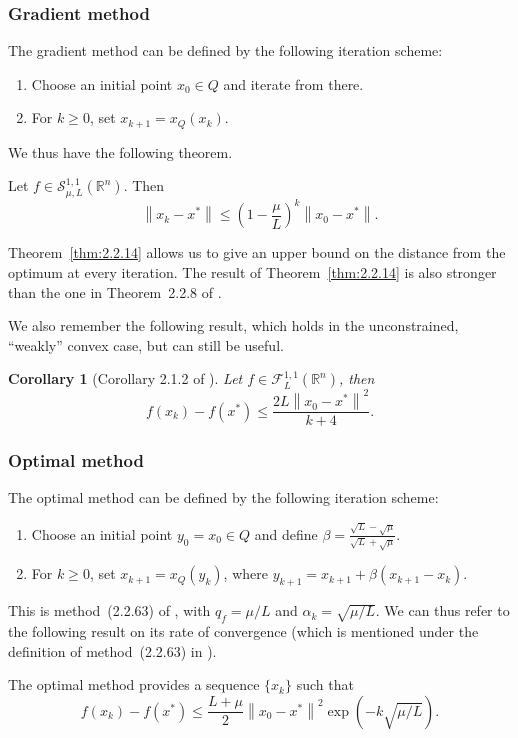 \documentclass[final]{aomart}
\newtheorem[{}\it]{thm}{Theorem}[section]
\newtheorem{cor}[thm]{Corollary}
\theoremstyle{definition}
\newtheorem*[{}\it]{notation}{Notation}
\numberwithin{equation}{section}
\newcommand{\thmref}[1]{Theorem~\ref{#1}}
\newcommand{\enVert}[1]{\left\lVert#1\right\rVert}
\let\norm=\enVert
\newcommand{\sconvex}{\mathscr{S}}
\begin{document}
\subsubsection{Gradient method}
The gradient method can be defined by the following iteration scheme:
\begin{enumerate}
	\item Choose an initial point \(x_0 \in Q\) and iterate from there.
	\item For \(k \geqslant 0\), set \(x_{k+1} = x_Q(x_k)\).
\end{enumerate}
We thus have the following theorem.
\begin{thm}
	\label{thm:2.2.14}
	Let \(f \in \sconvex_{\mu, L}^{1, 1}(\mathbb{R}^n)\).
	Then
	\begin{equation}
	\norm{x_k - x^*} \leqslant \left(1 - \frac{\mu}{L}\right)^k \norm{x_0 - x^*}.
	\end{equation}
\end{thm}
\thmref{thm:2.2.14} allows us to give an upper bound on the distance from the optimum at every iteration.
The result of \thmref{thm:2.2.14} is also stronger than the one in Theorem~2.2.8 of \cite{Nesterov2004}.

We also remember the following result, which holds in the unconstrained, ``weakly'' convex case, but can still be useful.
\begin{cor}[Corollary 2.1.2 of \cite{Nesterov2018}]
	\label{cor:2.1.2}
	Let \(f \in \mathscr{F}^{1, 1}_{L}(\mathbb{R}^n)\), then
	\begin{equation}
	f(x_k) - f(x^*) \leqslant \frac{2L\norm{x_0 - x^*}^2}{k+4}.
	\end{equation}
\end{cor}

\subsubsection{Optimal method}
The optimal method can be defined by the following iteration scheme:
\begin{enumerate}
	\item Choose an initial point \(y_0 = x_0 \in Q\) and define \(\beta = \frac{\sqrt{L} - \sqrt{\mu}}{\sqrt{L} + \sqrt{\mu}}\).
	\item For \(k \geqslant 0\), set \(x_{k+1} = x_Q(y_k)\), where \(y_{k+1} = x_{k+1} + \beta (x_{k+1} - x_k)\).
\end{enumerate}

This is method~(2.2.63) of \cite{Nesterov2018}, with \(q_f = \mu/L\) and \(\alpha_k = \sqrt{\mu/L}\).
We can thus refer to the following result on its rate of convergence (which is mentioned under the definition of method~(2.2.63) in \cite{Nesterov2018}).
\begin{thm}
	\label{thm:2.2.23}
	The optimal method provides a sequence \(\{x_k\}\) such that
	\begin{equation}
	f(x_k) - f(x^*) \leqslant \frac{L+\mu}{2} \norm{x_0 - x^*}^2 \exp(-k \sqrt{\mu/L}).
	\end{equation}
\end{thm}
\end{document}
